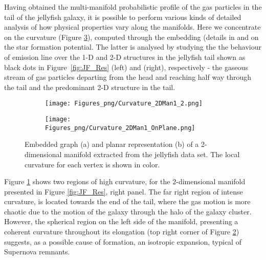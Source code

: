 Having obtained the multi-manifold probabilistic profile of the gas particles in the tail of the jellyfish galaxy,
it is possible to perform various kinds of detailed analysis of how physical properties vary along the manifolds.
Here we concentrate on the curvature (Figure \ref{fig:curvatureJF}), computed through the embedding (details in \citet{Canducci2021} and on the star formation potential.
The latter is analysed by studying the the behaviour of emission line \cii{} over the 1-D and 2-D structures
in the jellyfish tail shown as black dots in Figure~\ref{fig:JF_Res} (left) and (right), respectively
- the gaseous stream of gas particles departing from the head and reaching half way through the tail and the predominant 2-D structure in the tail.
\begin{figure}[ht]
\centering
\begin{subfigure}[t]{0.49\textwidth}
 \caption{}
 \label{subfig:CurvJF}
 \texttt{[image: Figures\_png/Curvature\_2DMan1\_2.png]}
\end{subfigure}
\begin{subfigure}[t]{0.49\textwidth}
 \caption{}
 \label{subfig:CurvJF_Plane}
 \texttt{[image: Figures\_png/Curvature\_2DMan1\_OnPlane.png]}
\end{subfigure}
\caption{Embedded graph (a) and planar representation (b) of a 2-dimensional manifold extracted from the jellyfish data set.
  The local curvature for each vertex is shown in color.}
\label{fig:curvatureJF}
\end{figure}

Figure \ref{subfig:CurvJF} shows two regions of high curvature, for the 2-dimensional manifold presented in Figure \ref{fig:JF_Res}, right panel.
The far right region of intense curvature, is located towards the end of the tail, where the gas motion is more chaotic due to the motion of the galaxy through the halo of the galaxy cluster. However, the spherical region on the left side of the manifold, presenting a coherent curvature throughout its elongation (top right corner of Figure \ref{subfig:CurvJF_Plane}) suggests, as a possible cause of formation, an isotropic expansion, typical of Supernova remnants.


